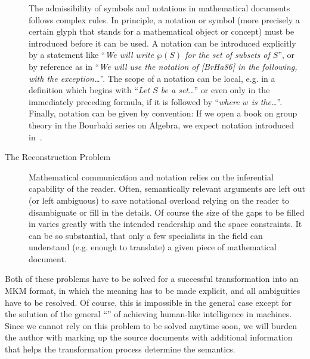 \begin{description}
  The admissibility of symbols and notations in mathematical documents follows
  complex rules. In principle, a notation or symbol (more precisely a certain
  glyph that stands for a mathematical object or concept) must be introduced
  before it can be used. A notation can be introduced explicitly by a statement
  like ``{\em{We will write $\wp(S)$ for the set of subsets of $S$}}'', or by
  reference as in ``{\em{We will use the notation of [BrHa86] in the following,
      with the exception\ldots}}''. The scope of a notation can be local, e.g. in
  a definition which begins with ``{\em{Let $S$ be a set\ldots}}'' or even only in
  the immediately preceding formula, if it is followed by ``{\em{where $w$ is
      the\ldots}}''. Finally, notation can be given by convention: If we open a
  book on group theory in the Bourbaki series on Algebra, we expect notation
  introduced in~\cite{Bourbaki:a74}.

\item[The Reconstruction Problem] Mathematical communication and notation relies
  on the inferential capability of the reader. Often, semantically relevant
  arguments are left out (or left ambiguous) to save notational overload relying
  on the reader to disambiguate or fill in the details. Of course the size of the
  gaps to be filled in varies greatly with the intended readership and the space
  constraints. It can be so substantial, that only a few specialists in the field
  can understand (e.g.  enough to translate) a given piece of mathematical
  document.
\end{description}
Both of these problems have to be solved for a successful transformation into an
MKM format, in which the meaning has to be made explicit, and all ambiguities have
to be resolved. Of course, this is impossible in the general case except for the
solution of the general ``{}'' of
achieving human-like intelligence in machines. Since we cannot rely on this
problem to be solved anytime soon, we will burden the author with marking up the
source documents with additional information that helps the transformation process
determine the semantics.

